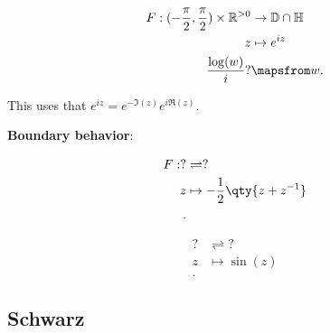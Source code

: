 \begin{proposition}

\begin{align*}
F: (-{\pi\over 2}, {\pi \over 2}) \times{\mathbb{R}}^{>0} &\to {\mathbb{D}}\cap{\mathbb{H}}\\
z &\mapsto e^{iz} \\
{\log(w) \over i}? &\mapsfrom w
.\end{align*}

This uses that \(e^{iz} = e^{-\Im(z)} e^{i \Re(z)}\).

\textbf{Boundary behavior}:

\end{proposition}

\begin{proposition}

\begin{align*}
F: ? &\rightleftharpoons? \\
z & \mapsto -{1\over 2}\qty{z + z^{-1}} \\
.\end{align*}

\end{proposition}

\begin{proposition}

\begin{align*}
? &\rightleftharpoons? \\
z &\mapsto \sin(z) \\
.\end{align*}

\end{proposition}

\hypertarget{schwarz}{%
\subsection{Schwarz}\label{schwarz}}

